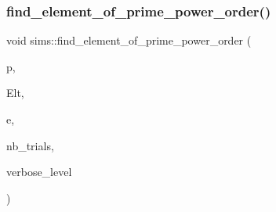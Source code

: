 \mbox{\label{classsims_aaa2d4a5f8ebb39fab9149d99b4d38fbc}} 
\subsubsection{\texorpdfstring{find\+\_\+element\+\_\+of\+\_\+prime\+\_\+power\+\_\+order()}{find\_element\_of\_prime\_power\_order()}}
{\footnotesize\ttfamily void sims\+::find\+\_\+element\+\_\+of\+\_\+prime\+\_\+power\+\_\+order (\begin{DoxyParamCaption}\item[{\mbox{\hyperlink{galois_8h_a09fddde158a3a20bd2dcadb609de11dc}{I\+NT}}}]{p,  }\item[{\mbox{\hyperlink{galois_8h_a09fddde158a3a20bd2dcadb609de11dc}{I\+NT}} $\ast$}]{Elt,  }\item[{\mbox{\hyperlink{galois_8h_a09fddde158a3a20bd2dcadb609de11dc}{I\+NT}} \&}]{e,  }\item[{\mbox{\hyperlink{galois_8h_a09fddde158a3a20bd2dcadb609de11dc}{I\+NT}} \&}]{nb\+\_\+trials,  }\item[{\mbox{\hyperlink{galois_8h_a09fddde158a3a20bd2dcadb609de11dc}{I\+NT}}}]{verbose\+\_\+level }\end{DoxyParamCaption})}

\mbox{\label{classsims_a76b4729b133fb5d7e1edaffe98a6eb5a}} 
